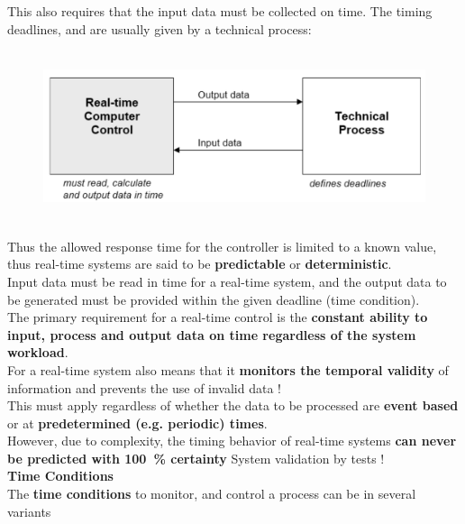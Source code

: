 This also requires that the input data must be collected on time. The timing deadlines, and are usually given by a technical process:\\

\begin{figure}[h]
    \centering
    \includegraphics[width=12cm, height=5cm]{Images/image61.png}
    \label{fig:Fig 7}
\end{figure}

Thus the allowed response time for the controller is limited to a known value, thus real-time systems are said to be \textbf{predictable} or \textbf{deterministic}.\\

Input data must be read in time for a real-time system, and the output data to be generated must be provided within the given deadline (time condition). \\

The primary requirement for a real-time control is the \textbf{constant ability to input, process and output data on time regardless of the system workload}.\\ 

For a real-time system also means that it \textbf{monitors the temporal validity} of information and prevents the use of invalid data !\\

This must apply regardless of whether the data to be processed are \textbf{event based} or at \textbf{predetermined (e.g. periodic) times}.\\

However, due to complexity, the timing behavior of real-time systems \textbf{can never be predicted with 100~\% certainty}  System validation by tests !\\

{\rot\bf Time Conditions}\\

The \textbf{time conditions} to monitor, and control a process can be in several variants

